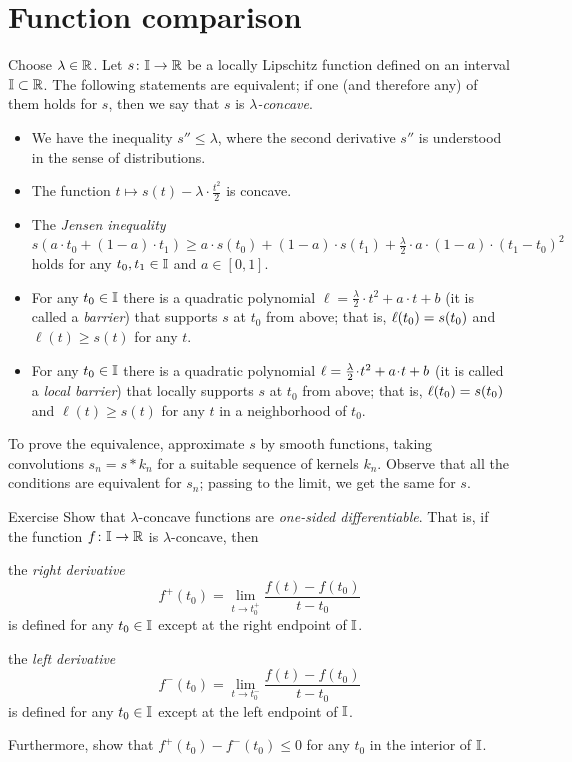 \section{Function comparison}\label{Function comparison}

Choose $\lambda\in \mathbb{R}$.
Let $s\colon\mathbb{I}\to\mathbb{R}$ be a locally Lipschitz function defined on an interval $\mathbb{I}\subset\mathbb{R}$.
The following statements are equivalent;
if one (and therefore any) of them holds for $s$, then we say that $s$ is \emph{$\lambda$-concave}.
\begin{itemize}
\item We have the inequality $s''\le \lambda$, where the second derivative $s''$ is understood in the sense of distributions.
\item The function $t\mapsto s(t)-\lambda\cdot\tfrac{t^2}2$ is concave.
\item The \emph{Jensen inequality}
\[s(a\cdot t_0+(1-a)\cdot t_1)\ge a\cdot s(t_0)+(1-a)\cdot s(t_1)+\tfrac\lambda2\cdot a\cdot(1-a)\cdot(t_1-t_0)^2 \]
holds for any $t_0,t_1\in \mathbb{I}$ and $a\in[0,1]$.
\item For any $t_0\in \mathbb{I}$ there is a quadratic polynomial $\ell=\tfrac\lambda2\cdot t^2+a\cdot t+b$ (it is called a \emph{barrier}) that supports $s$ at $t_0$ from above;
that is, $\ell(t_0)\z= s(t_0)$ and $\ell(t)\ge s(t)$ for any $t$.
\item For any $t_0\in \mathbb{I}$ there is a quadratic polynomial $\ell=\tfrac\lambda2\cdot t^2+a\cdot t\z+b$ (it is called a \emph{local barrier}) that locally supports $s$ at $t_0$ from above;
that is, $\ell(t_0)\z= s(t_0)$ and $\ell(t)\ge s(t)$ for any $t$ in a neighborhood of $t_0$.
\end{itemize}

To prove the equivalence, approximate $s$ by smooth functions, taking convolutions $s_n=s*k_n$ for a suitable sequence of kernels $k_n$.
Observe that all the conditions are equivalent for $s_n$;
passing to the limit, we get the same for $s$.

\begin{thm}{Exercise}\label{ex:concave'}
Show that $\lambda$-concave functions are {}\emph{one-sided differentiable}.
That is, if the function $f\colon\mathbb{I}\to\mathbb{R}$ is $\lambda$-concave, then
\begin{subthm}{}
the \emph{right derivative}
\[f^+(t_0)=\lim_{t\to t_0^+} \frac{f(t)-f(t_0)}{t-t_0}\]
is defined for any $t_0\in \mathbb{I}$ except at the right endpoint of $\mathbb{I}$.
\end{subthm}
\begin{subthm}{}
the \emph{left derivative}
\[f^-(t_0)=\lim_{t\to t_0^-} \frac{f(t)-f(t_0)}{t-t_0}\]
is defined for any $t_0\in \mathbb{I}$ except at the left endpoint of $\mathbb{I}$.
\end{subthm}

Furthermore, show that $f^+(t_0)-f^-(t_0)\le 0$ for any $t_0$ in the interior of $\mathbb{I}$.
\end{thm}

